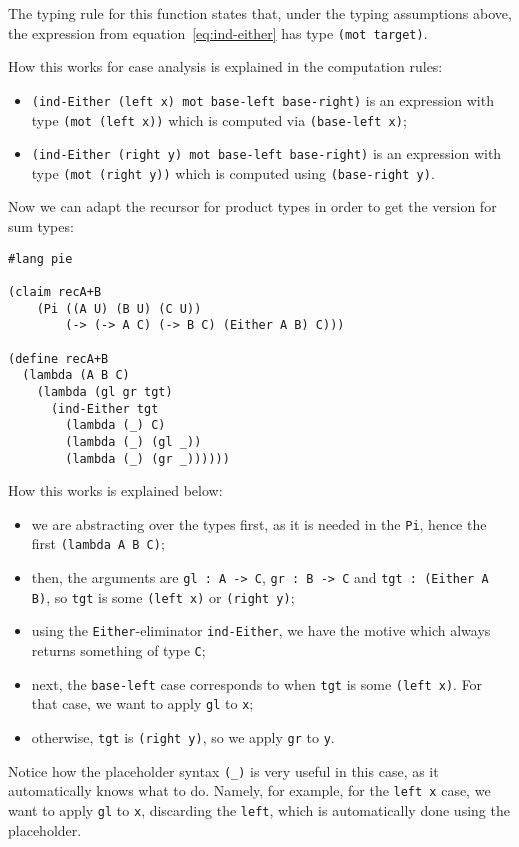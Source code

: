 The typing rule for this function states that, under the typing
assumptions above, the expression from equation~\eqref{eq:ind-either}
has type \texttt{(mot target)}.

How this works for case analysis is explained in the computation rules:
\begin{itemize}
\item \texttt{(ind-Either (left x) mot base-left base-right)} is an
  expression with type \texttt{(mot (left x))} which is computed
  via \texttt{(base-left x)};
\item \texttt{(ind-Either (right y) mot base-left base-right)} is an
  expression with type \texttt{(mot (right y))} which is computed
  using \texttt{(base-right y)}.
\end{itemize}

Now we can adapt the recursor for product types in order to
get the version for sum types:
{
  \small
\begin{verbatim}
#lang pie

(claim recA+B
    (Pi ((A U) (B U) (C U))
        (-> (-> A C) (-> B C) (Either A B) C)))

(define recA+B
  (lambda (A B C)
    (lambda (gl gr tgt)
      (ind-Either tgt
        (lambda (_) C)
        (lambda (_) (gl _))
        (lambda (_) (gr _))))))
\end{verbatim}
}

How this works is explained below:
\begin{itemize}
\item we are abstracting over the types first, as it is needed in the \texttt{Pi},
  hence the first \texttt{(lambda A B C)};
\item then, the arguments are \texttt{gl : A -> C}, \texttt{gr : B -> C} and
  \texttt{tgt : (Either A B)}, so \texttt{tgt} is some \texttt{(left x)} or
  \texttt{(right y)};
\item using the \texttt{Either}-eliminator \texttt{ind-Either}, we have the
  motive which always returns something of type \texttt{C};
\item next, the \texttt{base-left} case corresponds to when \texttt{tgt} is
  some \texttt{(left x)}. For that case, we want to apply \texttt{gl} to \texttt{x};
\item otherwise, \texttt{tgt} is \texttt{(right y)}, so we apply \texttt{gr} to \texttt{y}.
\end{itemize}

Notice how the placeholder syntax \texttt{(\_)} is very useful in this case, as it
automatically knows what to do. Namely, for example, for the \texttt{left x} case,
we want to apply \texttt{gl} to \texttt{x}, discarding the \texttt{left}, which is
automatically done using the placeholder.

